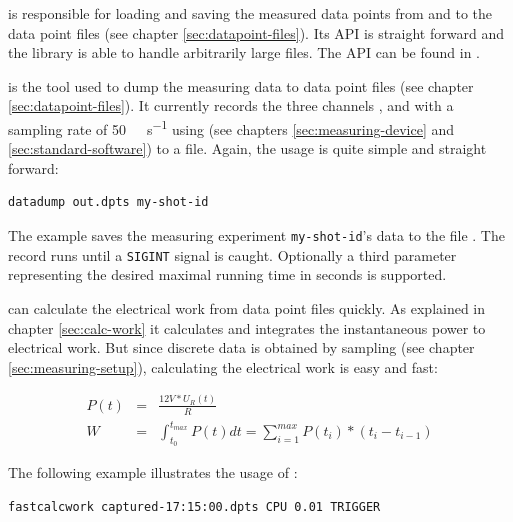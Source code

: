 \label{sec:special-developments}


\JWlfour{\JWTlibdp{}}

\JWTlibdp{} is responsible for loading and saving the measured data points from
and to the data point files (see chapter \ref{sec:datapoint-files}). Its API is
straight forward and the library is able to handle arbitrarily large files. The
API can be found in .


\JWlfour{\JWTdd{}}

\JWTdd{} is the tool used to dump the measuring data to data point files (see
chapter \ref{sec:datapoint-files}). It currently records the three channels
,  and  with a sampling rate of
\SI{50}{\kilo\samples\per\second} using \JWTnidaqmxbase{} (see chapters
\ref{sec:measuring-device} and \ref{sec:standard-software}) to a file.
Again, the usage is quite simple and straight forward:

\begin{lstlisting}[style=Shell]
datadump out.dpts my-shot-id
\end{lstlisting}

The example saves the measuring experiment \texttt{my-shot-id}'s data to the
file . The record runs until a \texttt{SIGINT} signal is
caught. Optionally a third parameter representing the desired maximal running
time in seconds is supported.


\JWlfour{\JWTfcw{}}

\JWTfcw{} can calculate the electrical work from data point files quick\-ly. As
explained in chapter \ref{sec:calc-work} it calculates and integrates the
instantaneous power to electrical work. But since discrete data is obtained by
sampling (see chapter \ref{sec:measuring-setup}), calculating the electrical
work is easy and fast:

\begin{eqnarray}
P(t) & = & \frac{12V * U_R(t)}{R} \\
W & = & \int_{t_0}^{t_{max}} P(t)dt = \sum_{i=1}^{max}P(t_i)*(t_i-t_{i-1})
\end{eqnarray}

The following example illustrates the usage of \JWTfcw{}:

\begin{lstlisting}[style=Shell]
fastcalcwork captured-17:15:00.dpts CPU 0.01 TRIGGER
\end{lstlisting}

